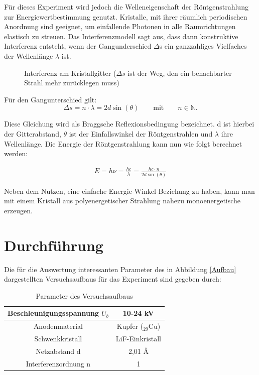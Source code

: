 Für dieses Experiment wird jedoch die Welleneigenschaft der Röntgenstrahlung zur Energiewertbestimmung genutzt. Kristalle,
mit ihrer räumlich periodischen Anordnung sind geeignet, um einfallende Photonen in alle Raumrichtungen elastisch zu streuen.
Das Interferenzmodell sagt aus, dass dann konstruktive Interferenz entsteht, wenn der Gangunderschied $\Delta$s ein
ganzzahliges Vielfaches der Wellenlänge $\lambda$ ist.

\begin{figure}[H]
\centering
\caption{Interferenz am Kristallgitter ($\Delta s$ ist der Weg, den ein benachbarter Strahl mehr zurücklegen muss)}
\label{Gitter}
\end{figure}

Für den Gangunterschied gilt:
\begin{equation}
 \Delta s = n \cdot \lambda = 2d\sin(\theta) \qquad \text{mit} \qquad n \in \mathbb{N}.
\end{equation}

Diese Gleichung wird als Braggsche Reflexionsbedingung bezeichnet. d ist hierbei der Gitterabstand, $\theta$ ist der
Einfallswinkel der Röntgenstrahlen und $\lambda$ ihre Wellenlänge. Die Energie der Röntgenstrahlung kann nun wie folgt
berechnet werden:

\begin{align}
E = h\nu = \frac{h c}{\lambda} = \frac{h c\cdot n}{2d\sin(\theta)}
\label{Bragg}
\end{align}

Neben dem Nutzen, eine einfache Energie-Winkel-Beziehung zu haben, kann man mit einem Kristall aus polyenergetischer
Strahlung nahezu monoenergetische erzeugen.

\section{Durchführung}
Die für die Auswertung interessanten Parameter des in Abbildung \ref{Aufbau} dargestellten Versuchsaufbaus für das Experiment
sind gegeben durch:

\renewcommand{\arraystretch}{1.5}
\begin{table}[H]
 \begin{tabular}{|c|c|}
\hline
Beschleunigungsspannung $U_b$ & 10-24 kV\\
\hline
Anodenmaterial & Kupfer ($_{29}$Cu)\\
\hline
Schwenkkristall & LiF-Einkristall\\
\hline
Netzabstand d & 2,01 \AA \\
\hline
Interferenzordnung n & 1\\
\hline
\end{tabular}
\caption{Parameter des Versuchsaufbaus}
\end{table}
\renewcommand{\arraystretch}{1}

